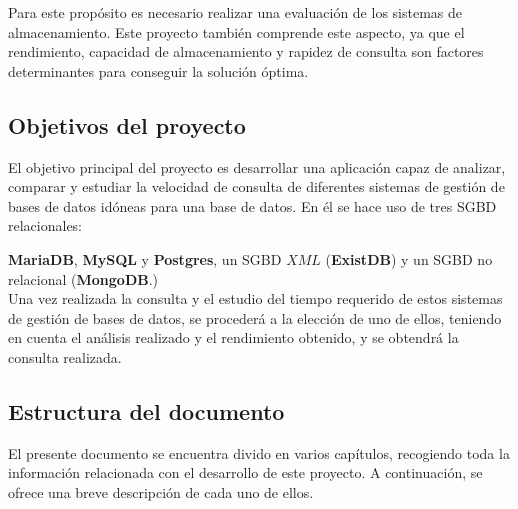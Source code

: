 \documentclass[12pt,a4paper]{article}
\begin{document}
Para este propósito es necesario realizar una evaluación de los sistemas de almacenamiento. Este proyecto también comprende este aspecto, ya que el rendimiento, capacidad de almacenamiento y rapidez de consulta son factores determinantes para conseguir la solución óptima.

\newpage

\subsection{Objetivos del proyecto} \label{pto13}

El objetivo principal del proyecto es desarrollar una aplicación capaz de analizar, comparar y estudiar la velocidad de consulta de diferentes sistemas de gestión de bases de datos idóneas para una base de datos. En él se hace uso de tres SGBD relacionales: 

\textbf{MariaDB}, \textbf{MySQL} y \textbf{Postgres}, un SGBD $XML$ (\textbf{ExistDB}) y un SGBD no relacional (\textbf{MongoDB}.)\\

Una vez realizada la consulta y el estudio del tiempo requerido de estos sistemas de gestión de bases de datos, se procederá a la elección de uno de ellos, teniendo en cuenta el análisis realizado y el rendimiento obtenido, y se obtendrá la consulta realizada.

\subsection{Estructura del documento} \label{pto14}
El presente documento se encuentra divido en varios capítulos, recogiendo toda la información relacionada con el desarrollo de este proyecto. A continuación, se ofrece una breve descripción de cada uno de ellos. 
\end{document}
